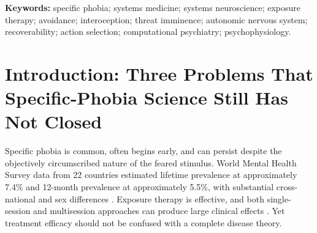 \documentclass[11pt]{article}
\begin{document}
\begin{abstract}
The model further predicts that phobia acquisition requires cue-linked horizon contraction, premature defensive termination, and failure to obtain informative evidence about preserved engagement recoverability. Avoidance maintains the disorder by restoring immediate recoverability through termination while preventing counterfactual sampling of what would have happened had engagement continued. Remission is reframed as \textbf{recoverability recalibration}, which may occur through in-vivo exposure, virtual exposure, nonconscious exposure, naturalistic benign encounters, sensorimotor retraining, or other informative state sampling. Durable remission requires generalization of recalibration across contexts and physiological states; relapse is predicted when new organismic or environmental conditions again contract estimated engagement-preserving recoverability.

RRHM absorbs established findings from fear and safety learning, threat imminence, interoception, allostatic control, autonomic physiology, sensorimotor regulation, and exposure therapy while making a narrower falsifiable claim. Its decisive prediction is that, when objective threat, threat probability, physical imminence, perceived control, escape availability, uncertainty, and number of actions are held constant, manipulating whether available actions preserve continued engagement should alter the timing of defensive transition. If engagement-preserving recoverability does not add incremental predictive value beyond established constructs, RRHM should be reduced or rejected.
\end{abstract}

\noindent\textbf{Keywords:} specific phobia; systems medicine; systems neuroscience; exposure therapy; avoidance; interoception; threat imminence; autonomic nervous system; recoverability; action selection; computational psychiatry; psychophysiology.

\section{Introduction: Three Problems That Specific-Phobia Science Still Has Not Closed}

Specific phobia is common, often begins early, and can persist despite the objectively circumscribed nature of the feared stimulus. World Mental Health Survey data from 22 countries estimated lifetime prevalence at approximately 7.4\% and 12-month prevalence at approximately 5.5\%, with substantial cross-national and sex differences \cite{wardenaar2017}. Exposure therapy is effective, and both single-session and multisession approaches can produce large clinical effects \cite{odgers2022}. Yet treatment efficacy should not be confused with a complete disease theory.
\end{document}
